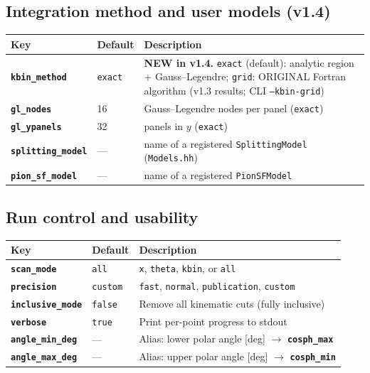 \documentclass[11pt,a4paper]{article}
\newcommand{\code}[1]{\texttt{#1}}
\newcommand{\inikey}[1]{\texttt{\textbf{#1}}}
\begin{document}
\subsection{Integration method and user models (v1.4)}

\begin{center}
\begin{tabular}{llp{8.3cm}}
\toprule
\textbf{Key} & \textbf{Default} & \textbf{Description} \\
\midrule
\inikey{kbin\_method} & \texttt{exact} & \textbf{NEW in v1.4.} \texttt{exact} (default): analytic region + Gauss--Legendre; \texttt{grid}: ORIGINAL Fortran algorithm (v1.3 results; CLI \texttt{--kbin-grid}) \\
\inikey{gl\_nodes}    & 16  & Gauss--Legendre nodes per panel (\texttt{exact}) \\
\inikey{gl\_ypanels}  & 32  & panels in $y$ (\texttt{exact}) \\
\inikey{splitting\_model} & --- & name of a registered \code{SplittingModel} (\texttt{Models.hh}) \\
\inikey{pion\_sf\_model}  & --- & name of a registered \code{PionSFModel} \\
\bottomrule
\end{tabular}
\end{center}

\subsection{Run control and usability}

\begin{center}
\begin{tabular}{lll}
\toprule
\textbf{Key} & \textbf{Default} & \textbf{Description} \\
\midrule
\inikey{scan\_mode}       & \texttt{all}    & \texttt{x}, \texttt{theta}, \texttt{kbin}, or \texttt{all} \\
\inikey{precision}        & \texttt{custom} & \texttt{fast}, \texttt{normal}, \texttt{publication}, \texttt{custom} \\
\inikey{inclusive\_mode}  & \texttt{false}  & Remove all kinematic cuts (fully inclusive) \\
\inikey{verbose}          & \texttt{true}   & Print per-point progress to stdout \\
\inikey{angle\_min\_deg}  & ---             & Alias: lower polar angle [deg] $\to$ \inikey{cosph\_max} \\
\inikey{angle\_max\_deg}  & ---             & Alias: upper polar angle [deg] $\to$ \inikey{cosph\_min} \\
\bottomrule
\end{tabular}
\end{center}
\end{document}
